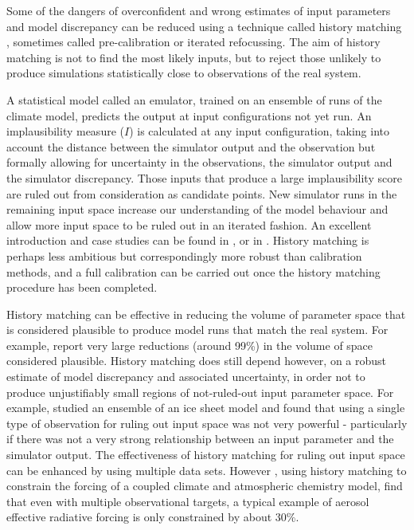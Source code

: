 \documentclass[gmd, manuscript]{copernicus}
\begin{document}
Some of the dangers of overconfident and wrong estimates of input parameters and model discrepancy can be reduced using a technique called history matching \citep{craig1996strategies}, sometimes called pre-calibration or iterated refocussing. The aim of history matching is not to find the most likely inputs, but to reject those unlikely to produce simulations statistically close to observations of the real system. 

A statistical model called an emulator, trained on an ensemble of runs of the climate model, predicts the output at input configurations not yet run. An implausibility measure ($I$) is calculated at any input configuration, taking into account the distance between the simulator output and the observation but formally allowing for uncertainty in the observations, the simulator output and the simulator discrepancy. Those inputs that produce a large implausibility score are ruled out from consideration as candidate points. New simulator runs in the remaining input space increase our understanding of the model behaviour and allow more input space to be ruled out in an iterated fashion. An excellent introduction and case studies can be found in \cite{andrianakis2015bayesian}, or in \cite{vernon2010galaxy}. History matching is perhaps less ambitious but correspondingly more robust than calibration methods, and a full calibration can be carried out once the history matching procedure has been completed.

History matching can be effective in reducing the volume of parameter space that is considered plausible to produce model runs that match the real system. For example, \cite{williamson2015identifying} report very large reductions (around 99\%) in the volume of space considered plausible. History matching does still depend however, on a robust estimate of model discrepancy and associated uncertainty, in order not to produce unjustifiably small regions of not-ruled-out input parameter space. For example, \cite{mcneall2013potential} studied an ensemble of an ice sheet model and found that using a single type of observation for ruling out input space was not very powerful - particularly if there was not a very strong relationship between an input parameter and the simulator output. The effectiveness of history matching for ruling out input space can be enhanced by using multiple data sets. However \cite{johnson2018importance}, using history matching to constrain the forcing of a coupled climate and atmospheric chemistry model, find that even with multiple observational targets, a typical example of aerosol effective radiative forcing is only constrained by about 30\%.
\end{document}
